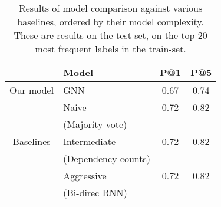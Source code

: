 \begin{table}
 \centering
 {\renewcommand{\arraystretch}{1.3}%
 \begin{tabular}{c|lcc}
 	 ~ & \textbf{Model} & \textbf{P@1} & \textbf{P@5} \\
 	\hline
 	Our model & GNN & 0.67 & 0.74 \\
 	\hline
 	 ~ & Naive & 0.72 & 0.82 \\
 	 ~	 & (Majority vote) & ~ & ~ \\
	\cline{2-4}
	 Baselines & Intermediate & 0.72 & 0.82 \\
 	 ~	 & (Dependency counts) & ~ & ~ \\
 	\cline{2-4}
	 ~	 & Aggressive & 0.72 & 0.82 \\
 	 ~	 & (Bi-direc RNN) & ~ & ~ \\
 \end{tabular}
}
 \caption{Results of model comparison against various baselines, ordered by their model complexity. These are results on the test-set, on the top 20 most frequent labels in the train-set.}
 \label{tab:results:baselines}
\end{table}

